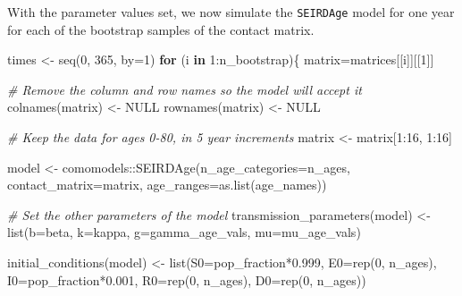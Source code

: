 \documentclass[
]{article}
\newenvironment{Shaded}{\begin{snugshade}}{\end{snugshade}}
\newcommand{\AttributeTok}[1]{\textcolor[rgb]{0.77,0.63,0.00}{#1}}
\newcommand{\CommentTok}[1]{\textcolor[rgb]{0.56,0.35,0.01}{\textit{#1}}}
\newcommand{\ConstantTok}[1]{\textcolor[rgb]{0.00,0.00,0.00}{#1}}
\newcommand{\ControlFlowTok}[1]{\textcolor[rgb]{0.13,0.29,0.53}{\textbf{#1}}}
\newcommand{\DecValTok}[1]{\textcolor[rgb]{0.00,0.00,0.81}{#1}}
\newcommand{\FloatTok}[1]{\textcolor[rgb]{0.00,0.00,0.81}{#1}}
\newcommand{\FunctionTok}[1]{\textcolor[rgb]{0.00,0.00,0.00}{#1}}
\newcommand{\NormalTok}[1]{#1}
\newcommand{\OtherTok}[1]{\textcolor[rgb]{0.56,0.35,0.01}{#1}}
\newcommand{\SpecialCharTok}[1]{\textcolor[rgb]{0.00,0.00,0.00}{#1}}
\begin{document}
With the parameter values set, we now simulate the \texttt{SEIRDAge}
model for one year for each of the bootstrap samples of the contact
matrix.

\begin{Shaded}
\begin{Highlighting}[]
\NormalTok{times }\OtherTok{\textless{}{-}} \FunctionTok{seq}\NormalTok{(}\DecValTok{0}\NormalTok{, }\DecValTok{365}\NormalTok{, }\AttributeTok{by=}\DecValTok{1}\NormalTok{)}
\ControlFlowTok{for}\NormalTok{ (i }\ControlFlowTok{in} \DecValTok{1}\SpecialCharTok{:}\NormalTok{n\_bootstrap)\{}
\NormalTok{  matrix}\OtherTok{=}\NormalTok{matrices[[i]][[}\DecValTok{1}\NormalTok{]]}

  \CommentTok{\# Remove the column and row names so the model will accept it}
  \FunctionTok{colnames}\NormalTok{(matrix) }\OtherTok{\textless{}{-}} \ConstantTok{NULL}
  \FunctionTok{rownames}\NormalTok{(matrix) }\OtherTok{\textless{}{-}} \ConstantTok{NULL}

  \CommentTok{\# Keep the data for ages 0{-}80, in 5 year increments}
\NormalTok{  matrix }\OtherTok{\textless{}{-}}\NormalTok{ matrix[}\DecValTok{1}\SpecialCharTok{:}\DecValTok{16}\NormalTok{, }\DecValTok{1}\SpecialCharTok{:}\DecValTok{16}\NormalTok{]}

\NormalTok{  model }\OtherTok{\textless{}{-}}\NormalTok{ comomodels}\SpecialCharTok{::}\FunctionTok{SEIRDAge}\NormalTok{(}\AttributeTok{n\_age\_categories=}\NormalTok{n\_ages,}
                   \AttributeTok{contact\_matrix=}\NormalTok{matrix,}
                   \AttributeTok{age\_ranges=}\FunctionTok{as.list}\NormalTok{(age\_names))}

  \CommentTok{\# Set the other parameters of the model}
  \FunctionTok{transmission\_parameters}\NormalTok{(model) }\OtherTok{\textless{}{-}} \FunctionTok{list}\NormalTok{(}\AttributeTok{b=}\NormalTok{beta,}
                                         \AttributeTok{k=}\NormalTok{kappa,}
                                         \AttributeTok{g=}\NormalTok{gamma\_age\_vals,}
                                         \AttributeTok{mu=}\NormalTok{mu\_age\_vals)}

  \FunctionTok{initial\_conditions}\NormalTok{(model) }\OtherTok{\textless{}{-}} \FunctionTok{list}\NormalTok{(}\AttributeTok{S0=}\NormalTok{pop\_fraction}\SpecialCharTok{*}\FloatTok{0.999}\NormalTok{,}
                                    \AttributeTok{E0=}\FunctionTok{rep}\NormalTok{(}\DecValTok{0}\NormalTok{, n\_ages),}
                                    \AttributeTok{I0=}\NormalTok{pop\_fraction}\SpecialCharTok{*}\FloatTok{0.001}\NormalTok{,}
                                    \AttributeTok{R0=}\FunctionTok{rep}\NormalTok{(}\DecValTok{0}\NormalTok{, n\_ages),}
                                    \AttributeTok{D0=}\FunctionTok{rep}\NormalTok{(}\DecValTok{0}\NormalTok{, n\_ages))}
  

\end{Highlighting}
\end{Shaded}
\end{document}
